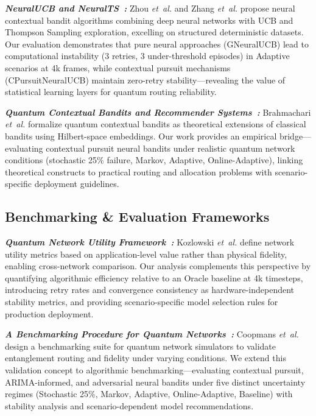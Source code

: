\documentclass[sigconf,anonymous,review,natbib=false]{acmart}
\newcommand{\etal}{\emph{et~al.}\xspace}
\newcommand{\smallTitle}[1]{\vspace{1mm} \noindent \textbf{#1: }}
\begin{document}
\noindent\textit{\smallTitle{NeuralUCB and NeuralTS~\cite{zhou2020neuralucb,zhang2022neuralts}} }
Zhou \etal and Zhang \etal propose neural contextual bandit algorithms combining deep neural networks with UCB and Thompson Sampling exploration, excelling on structured deterministic datasets. Our evaluation demonstrates that pure neural approaches (GNeuralUCB) lead to computational instability (3 retries, 3 under-threshold episodes) in Adaptive scenarios at 4k frames, while contextual pursuit mechanisms (CPursuitNeuralUCB) maintain zero-retry stability—revealing the value of statistical learning layers for quantum routing reliability.

\noindent\textit{\smallTitle{Quantum Contextual Bandits and Recommender Systems~\cite{brahmachari2024quantum}} }
Brahmachari \etal formalize quantum contextual bandits as theoretical extensions of classical bandits using Hilbert-space embeddings. Our work provides an empirical bridge—evaluating contextual pursuit neural bandits under realistic quantum network conditions (stochastic 25\% failure, Markov, Adaptive, Online-Adaptive), linking theoretical constructs to practical routing and allocation problems with scenario-specific deployment guidelines.

\subsection{Benchmarking \& Evaluation Frameworks}

\textit{\smallTitle{Quantum Network Utility Framework~\cite{kozlowski2022utility}} }
Kozlowski \etal define network utility metrics based on application-level value rather than physical fidelity, enabling cross-network comparison. Our analysis complements this perspective by quantifying algorithmic efficiency relative to an Oracle baseline at 4k timesteps, introducing retry rates and convergence consistency as hardware-independent stability metrics, and providing scenario-specific model selection rules for production deployment.

\noindent\textit{\smallTitle{A Benchmarking Procedure for Quantum Networks~\cite{coopmans2021benchmark}} }
Coopmans \etal design a benchmarking suite for quantum network simulators to validate entanglement routing and fidelity under varying conditions. We extend this validation concept to algorithmic benchmarking—evaluating contextual pursuit, ARIMA-informed, and adversarial neural bandits under five distinct uncertainty regimes (Stochastic 25\%, Markov, Adaptive, Online-Adaptive, Baseline) with stability analysis and scenario-dependent model recommendations.
\end{document}
